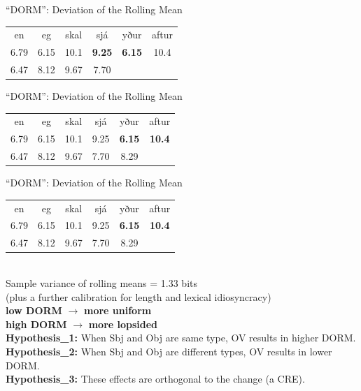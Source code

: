 \documentclass[hyperref={pdfpagelabels=false}]{beamer}
\begin{document}
\begin{frame}{``DORM'': Deviation of the Rolling Mean} 
	
	\begin{center}
		\begin{tabular}{c c c c c c}
			en & eg & skal & sjá & yður & aftur \\
			6.79 & 6.15 & 10.1 & \textbf{9.25} & \textbf{6.15} & 10.4\\
			6.47 & 8.12 & 9.67 & 7.70 & & 
		\end{tabular}
	\end{center}
	
\end{frame}

\begin{frame}{``DORM'': Deviation of the Rolling Mean} 
	
	\begin{center}
		\begin{tabular}{c c c c c c}
			en & eg & skal & sjá & yður & aftur \\
			6.79 & 6.15 & 10.1 & 9.25 & \textbf{6.15} & \textbf{10.4}\\
			6.47 & 8.12 & 9.67 & 7.70 & 8.29 & \\
		\end{tabular}
	\end{center}
	
\end{frame}

\begin{frame}{``DORM'': Deviation of the Rolling Mean} 
	
	\begin{center}
		\begin{tabular}{c c c c c c}
			en & eg & skal & sjá & yður & aftur \\
			6.79 & 6.15 & 10.1 & 9.25 & \textbf{6.15} & \textbf{10.4}\\
			6.47 & 8.12 & 9.67 & 7.70 & 8.29 & \\
		\end{tabular} \\\vspace*{5mm}
		Sample variance of rolling means = 1.33 bits\\
		(plus a further calibration for length and lexical idiosyncracy)\\\vspace*{3mm}
		\textbf{low DORM} $\rightarrow$ \textbf{more uniform}\\
		\textbf{high DORM} $\rightarrow$ \textbf{more lopsided}\\\vspace{4mm}\pause
		\textbf{Hypothesis_1:} When Sbj and Obj are same type, OV results in higher DORM.\\
		\textbf{Hypothesis_2:} When Sbj and Obj are different types, OV results in lower DORM.\\
		\textbf{Hypothesis_3:} These effects are orthogonal to the change (a CRE).\\
	\end{center}
	
\end{frame}
\end{document}
